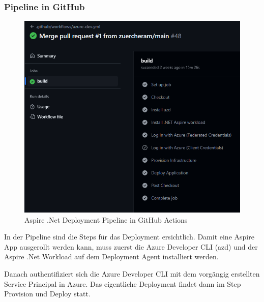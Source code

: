         \subsubsection{Pipeline in GitHub}
        
            \begin{figure}[ht]
                \centering
                \includegraphics[scale=0.6]{Ressources/Bilder/pipeline.png}
                \caption{Aspire .Net Deployment Pipeline in GitHub Actions}
                \label{fig:pipeline}
            \end{figure}            

            In der Pipeline sind die Steps für das Deployment ersichtlich. Damit eine Aspire App ausgerollt werden kann, muss zuerst die Azure Developer CLI (azd) und der Aspire .Net Workload auf dem Deployment Agent installiert werden.

            Danach authentifiziert sich die Azure Developer CLI mit dem vorgängig erstellten Service Principal in Azure. Das eigentliche Deployment findet dann im Step Provision und Deploy statt.
            
